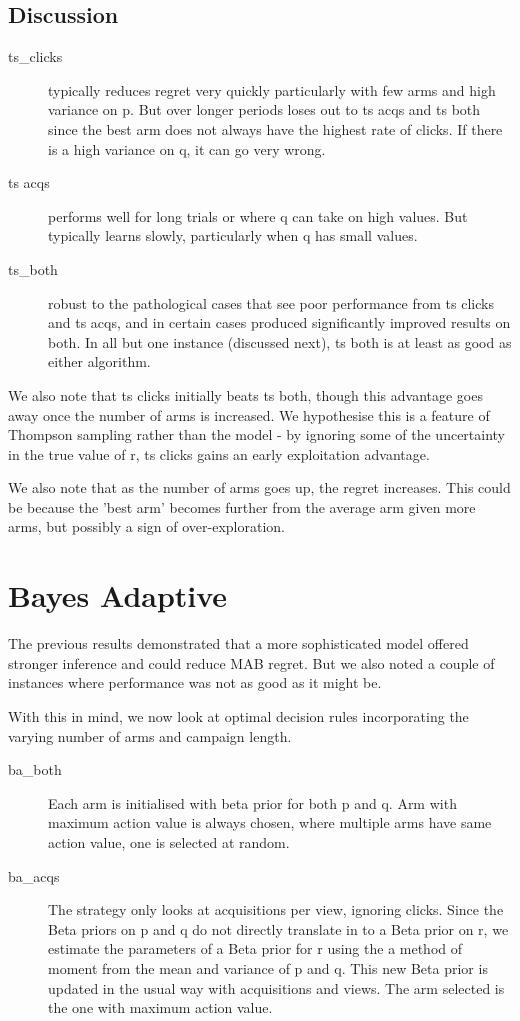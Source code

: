 \documentclass[11pt,a4,singlespacing,titlepagenumber=on]{scrreprt}
\numberwithin{equation}{chapter} %
\theoremstyle{remark}
\begin{document}
\subsection{Discussion}

\begin{description}
	\item[ts\_clicks] typically reduces regret very quickly particularly with few arms and high variance on p. But over longer periods loses out to ts acqs and ts both since the best arm does not always have the highest rate of clicks. If there is a high variance on q, it can go very wrong.
	\item[ts acqs] performs well for long trials or where q can take on high values. But typically learns slowly, particularly when q has small values.
	\item[ts\_both] robust to the pathological cases that see poor performance from ts clicks and ts acqs, and in certain cases produced significantly improved results on both. In all but one instance (discussed next), ts both is at least as good as either algorithm.

\end{description}

We also note that ts clicks initially beats ts both, though this advantage goes away once the number of arms is increased. We hypothesise this is a feature of Thompson sampling rather than the model - by ignoring some of the uncertainty in the true value of r, ts clicks gains an early exploitation advantage.

We also note that as the number of arms goes up, the regret increases. This could be because the 'best arm' becomes further from the average arm given more arms, but possibly a sign of over-exploration.


\section{ Bayes Adaptive }

The previous results demonstrated that a more sophisticated model offered stronger inference and could reduce MAB regret. But we also noted a couple of instances where performance was not as good as it might be. 

With this in mind, we now look at optimal decision rules incorporating the varying number of arms and campaign length.

\begin{description}
	\item[ba\_both] Each arm is initialised with beta prior for both p and q. Arm with maximum action value is always chosen, where multiple arms have same action value, one is selected at random.
	\item[ba\_acqs] The strategy only looks at acquisitions per view, ignoring clicks. Since the Beta priors on p and q do not directly translate in to a Beta prior on r, we estimate the parameters of a Beta prior for r using the a method of moment from the mean and variance of p and q. This new Beta prior is updated in the usual way with acquisitions and views. The arm selected is the one with maximum action value.
\end{description}
\end{document}
